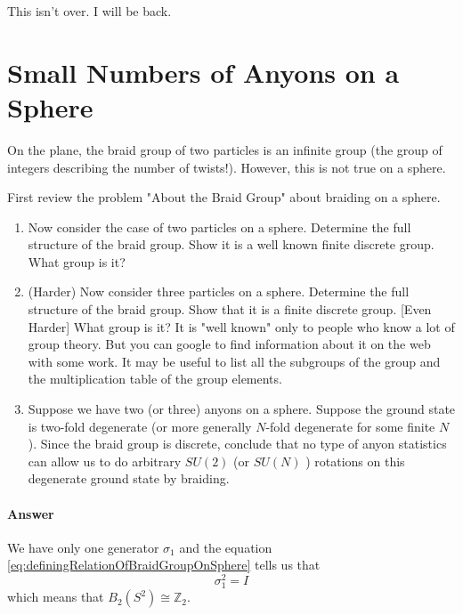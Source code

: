 \documentclass{book}
\begin{document}
This isn't over. I will be back.

\section{Small Numbers of Anyons on a Sphere}
On the plane, the braid group of two particles is an infinite group (the group of integers describing the number of twists!). However, this is not true on a sphere.

First review the problem "About the Braid Group" about braiding on a sphere.
\begin{enumerate}
\item Now consider the case of two particles on a sphere. Determine the full structure of the braid group. Show it is a well known finite discrete group. What group is it?
\item (Harder) Now consider three particles on a sphere. Determine the full structure of the braid group. Show that it is a finite discrete group. [Even Harder] What group is it? It is "well known" only to people who know a lot of group theory. But you can google to find information about it on the web with some work. It may be useful to list all the subgroups of the group and the multiplication table of the group elements.
\item Suppose we have two (or three) anyons on a sphere. Suppose the ground state is two-fold degenerate (or more generally $N$-fold degenerate for some finite $N$ ). Since the braid group is discrete, conclude that no type of anyon statistics can allow us to do arbitrary $SU(2)$ (or $SU(N)$ ) rotations on this degenerate ground state by braiding.
\end{enumerate}

\paragraph{Answer}
We have only one generator $\sigma _{1}$ and the equation \eqref{eq:definingRelationOfBraidGroupOnSphere} tells us that
\begin{equation*}
\sigma _{1}^{2} =I
\end{equation*}
which means that $B_{2} (S^{2} )\cong \mathbb{Z}_{2}$.
\end{document}
